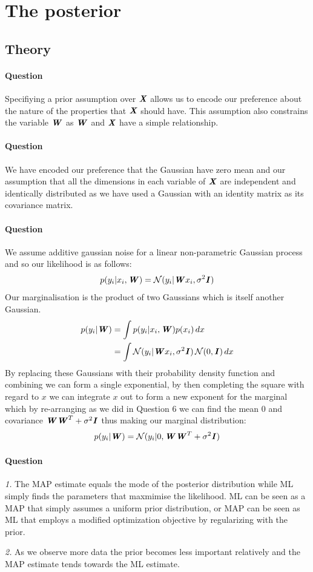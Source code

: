 \documentclass{article}
\newcounter{question}
\newcommand{\question}{\stepcounter{question}\paragraph{Question \thequestion}}
\newcommand{\mat}[1]{\textbf{\textit{#1}}}
\begin{document}
\section{The posterior}
\subsection{Theory}
\question Specifiying a prior assumption over $\mat{X}$ allows us to encode our preference about the nature of the properties that $\mat{X}$ should have. This assumption also constrains the variable $\mat{W}$ as $\mat{W}$ and $\mat{X}$ have a simple relationship.
\question We have encoded our preference that the Gaussian have zero mean and our assumption that all the dimensions in each variable of $\mat{X}$ are independent and identically distributed as we have used a Gaussian with an identity matrix as its covariance matrix.
\question We assume additive gaussian noise for a linear non-parametric Gaussian process and so our likelihood is as follows:
\begin{align*}
	p(y_i|x_i,\mat{W}) = \mathcal{N}(y_i|\mat{W}x_i, \sigma^2\mat{I})
\end{align*}
Our marginalisation is the product of two Gaussians which is itself another Gaussian.
\begin{align*}
	p(y_i|\mat{W}) &= \int p(y_i|x_i,\mat{W})p(x_i)\,dx \\
	&= \int \mathcal{N}(y_i|\mat{W}x_i, \sigma^2\mat{I})\,\mathcal{N}(0,\mat{I})\,dx
\end{align*}
By replacing these Gaussians with their probability density function and combining we can form a single exponential, by then completing the square with regard to $x$ we can integrate $x$ out to form a new exponent for the marginal which by re-arranging as we did in Question 6 we can find the mean $0$ and covariance $\mat{W}\mat{W}^T + \sigma^2\mat{I}$ thus making our marginal distribution:
\begin{align*}
	p(y_i|\mat{W}) = \mathcal{N}(y_i|0, \mat{W}\mat{W}^T + \sigma^2\mat{I})
\end{align*}
\question \emph{1.} The MAP estimate equals the mode of the posterior distribution while ML simply finds the parameters that maxmimise the likelihood. ML can be seen as a MAP that simply assumes a uniform prior distribution, or MAP can be seen as ML that employs a modified optimization objective by regularizing with the prior.

\emph{2.} As we observe more data the prior becomes less important relatively and the MAP estimate tends towards the ML estimate.
\end{document}
